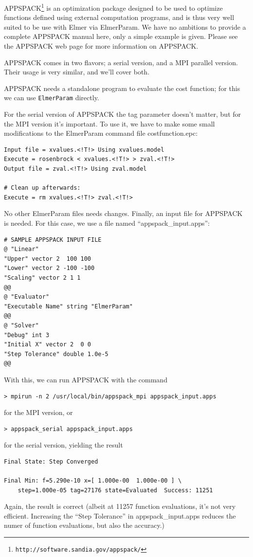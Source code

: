\documentclass[12pt,a4paper]{article}
\newcommand{\code}[1]{\texttt{#1}}
\begin{document}
APPSPACK\footnote{\code{http://software.sandia.gov/appspack/}} is an
optimization package designed to be used to optimize functions defined
using external computation programs, and is thus very well suited to be use
with Elmer via ElmerParam.  We have no ambitions to provide a complete
APPSPACK manual here, only a simple example is given.  Please see the
APPSPACK web page for more information on APPSPACK.

APPSPACK comes in two flavors; a serial version, and a MPI parallel
version. Their usage is very similar, and we'll cover both.

APPSPACK needs a standalone program to evaluate the cost function; for this
we can use \code{ElmerParam} directly.

For the serial version of APPSPACK the tag parameter doesn't matter, but
for the MPI version it's important.  To use it, we have to make some small
modifications to the ElmerParam command file costfunction.epc:
\begin{verbatim}
Input file = xvalues.<!T!> Using xvalues.model
Execute = rosenbrock < xvalues.<!T!> > zval.<!T!>
Output file = zval.<!T!> Using zval.model

# Clean up afterwards:
Execute = rm xvalues.<!T!> zval.<!T!>
\end{verbatim}
No other ElmerParam files needs changes.  Finally, an input file for
APPSPACK is needed.  For this case, we use a file named
``\mbox{appspack\_input.apps}'':
\begin{verbatim}
# SAMPLE APPSPACK INPUT FILE
@ "Linear"
"Upper" vector 2  100 100
"Lower" vector 2 -100 -100
"Scaling" vector 2 1 1
@@
@ "Evaluator"
"Executable Name" string "ElmerParam"
@@
@ "Solver" 
"Debug" int 3
"Initial X" vector 2  0 0
"Step Tolerance" double 1.0e-5
@@
\end{verbatim}
With this, we can run APPSPACK with the command
\begin{verbatim}
> mpirun -n 2 /usr/local/bin/appspack_mpi appspack_input.apps
\end{verbatim}
for the MPI version, or
\begin{verbatim}
> appspack_serial appspack_input.apps
\end{verbatim}
for the serial version, yielding the result
\begin{verbatim}
Final State: Step Converged

Final Min: f=5.290e-10 x=[ 1.000e-00  1.000e-00 ] \
    step=1.000e-05 tag=27176 state=Evaluated  Success: 11251
\end{verbatim}
Again, the result is correct (albeit at 11257 function evaluations, it's
not very efficient.  Increasing the ``Step Tolerance'' in
\mbox{appspack\_input.apps} reduces the numer of function evaluations, but
also the accuracy.)
\end{document}
